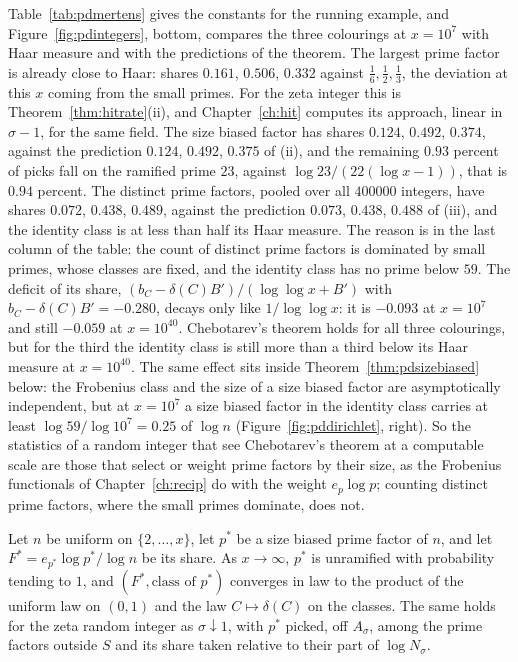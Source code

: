 Table~\ref{tab:pdmertens} gives the constants for the running example, and Figure~\ref{fig:pdintegers}, bottom, compares the three colourings at $x=10^7$ with Haar measure and with the predictions of the theorem. The largest prime factor is already close to Haar: shares $0.161$, $0.506$, $0.332$ against $\frac16,\frac12,\frac13$, the deviation at this $x$ coming from the small primes. For the zeta integer this is Theorem~\ref{thm:hitrate}(ii), and Chapter~\ref{ch:hit} computes its approach, linear in $\sigma-1$, for the same field. The size biased factor has shares $0.124$, $0.492$, $0.374$, against the prediction $0.124$, $0.492$, $0.375$ of (ii), and the remaining $0.93$ percent of picks fall on the ramified prime $23$, against $\log23/(22(\log x-1))$, that is $0.94$ percent. The distinct prime factors, pooled over all $400000$ integers, have shares $0.072$, $0.438$, $0.489$, against the prediction $0.073$, $0.438$, $0.488$ of (iii), and the identity class is at less than half its Haar measure. The reason is in the last column of the table: the count of distinct prime factors is dominated by small primes, whose classes are fixed, and the identity class has no prime below $59$. The deficit of its share, $(b_C-\delta(C)B')/(\log\log x+B')$ with $b_C-\delta(C)B'=-0.280$, decays only like $1/\log\log x$: it is $-0.093$ at $x=10^7$ and still $-0.059$ at $x=10^{40}$. Chebotarev's theorem holds for all three colourings, but for the third the identity class is still more than a third below its Haar measure at $x=10^{40}$. The same effect sits inside Theorem~\ref{thm:pdsizebiased} below: the Frobenius class and the size of a size biased factor are asymptotically independent, but at $x=10^7$ a size biased factor in the identity class carries at least $\log59/\log10^7=0.25$ of $\log n$ (Figure~\ref{fig:pddirichlet}, right). So the statistics of a random integer that see Chebotarev's theorem at a computable scale are those that select or weight prime factors by their size, as the Frobenius functionals of Chapter~\ref{ch:recip} do with the weight $e_p\log p$; counting distinct prime factors, where the small primes dominate, does not.

\begin{theorem}\label{thm:pdsizebiased}
Let $n$ be uniform on $\{2,\dots,x\}$, let $p^*$ be a size biased prime factor of $n$, and let $F^*=e_{p^*}\log p^*/\log n$ be its share. As $x\to\infty$, $p^*$ is unramified with probability tending to $1$, and $(F^*,\text{class of }p^*)$ converges in law to the product of the uniform law on $(0,1)$ and the law $C\mapsto\delta(C)$ on the classes. The same holds for the zeta random integer as $\sigma\downarrow1$, with $p^*$ picked, off $A_\sigma$, among the prime factors outside $S$ and its share taken relative to their part of $\log N_\sigma$.
\end{theorem}

